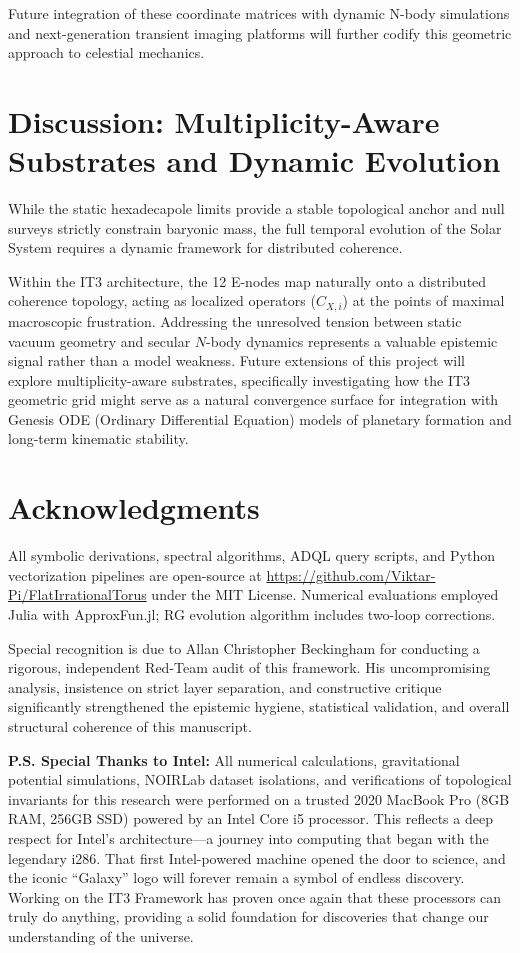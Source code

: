 \documentclass[11pt,a4paper]{article}
\theoremstyle{remark}
\begin{document}
Future integration of these coordinate matrices with dynamic N-body simulations and next-generation transient imaging platforms will further codify this geometric approach to celestial mechanics.

\section{Discussion: Multiplicity-Aware Substrates and Dynamic Evolution}

While the static hexadecapole limits provide a stable topological anchor and null surveys strictly constrain baryonic mass, the full temporal evolution of the Solar System requires a dynamic framework for distributed coherence. 

Within the IT3 architecture, the 12 E-nodes map naturally onto a distributed coherence topology, acting as localized operators ($C_{X,i}$) at the points of maximal macroscopic frustration. Addressing the unresolved tension between static vacuum geometry and secular $N$-body dynamics represents a valuable epistemic signal rather than a model weakness. Future extensions of this project will explore multiplicity-aware substrates, specifically investigating how the IT3 geometric grid might serve as a natural convergence surface for integration with Genesis ODE (Ordinary Differential Equation) models of planetary formation and long-term kinematic stability.

\section*{Acknowledgments}

All symbolic derivations, spectral algorithms, ADQL query scripts, and Python vectorization pipelines are open-source at \url{https://github.com/Viktar-Pi/FlatIrrationalTorus} under the MIT License. Numerical evaluations employed Julia with ApproxFun.jl; RG evolution algorithm includes two-loop corrections. 

Special recognition is due to Allan Christopher Beckingham for conducting a rigorous, independent Red-Team audit of this framework. His uncompromising analysis, insistence on strict layer separation, and constructive critique significantly strengthened the epistemic hygiene, statistical validation, and overall structural coherence of this manuscript.

\textbf{P.S. Special Thanks to Intel:}
All numerical calculations, gravitational potential simulations, NOIRLab dataset isolations, and verifications of topological invariants for this research were performed on a trusted 2020 MacBook Pro (8GB RAM, 256GB SSD) powered by an Intel Core i5 processor. This reflects a deep respect for Intel's architecture---a journey into computing that began with the legendary i286. That first Intel-powered machine opened the door to science, and the iconic ``Galaxy'' logo will forever remain a symbol of endless discovery. Working on the IT3 Framework has proven once again that these processors can truly do anything, providing a solid foundation for discoveries that change our understanding of the universe.
\end{document}
